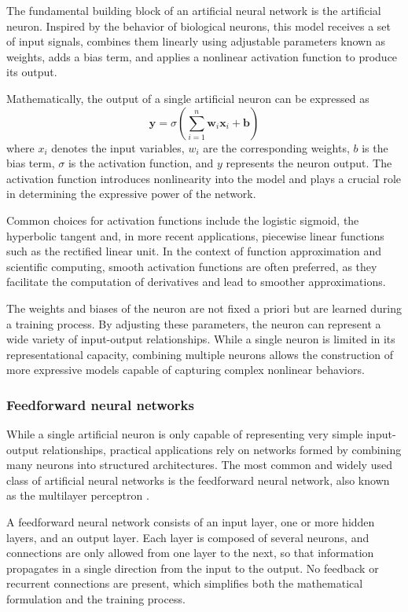 \documentclass[final,1p,times]{elsarticle}
\theoremstyle{definition}
\begin{document}
The fundamental building block of an artificial neural network is the artificial neuron. Inspired by the behavior of biological neurons, this model receives a set of input signals, combines them linearly using adjustable parameters known as weights, adds a bias term, and applies a nonlinear activation function to produce its output.

Mathematically, the output of a single artificial neuron can be expressed as
\[
\mathbf{y} = \sigma\left( \sum_{i=1}^{n} \mathbf{w}_i \mathbf{x}_i + \mathbf{b} \right)
\]
where $x_i$ denotes the input variables, $w_i$ are the corresponding weights, $b$ is the bias term, $\sigma$ is the activation function, and $y$ represents the neuron output. The activation function introduces nonlinearity into the model and plays a crucial role in determining the expressive power of the network.

Common choices for activation functions include the logistic sigmoid, the hyperbolic tangent and, in more recent applications, piecewise linear functions such as the rectified linear unit. In the context of function approximation and scientific computing, smooth activation functions are often preferred, as they facilitate the computation of derivatives and lead to smoother approximations.

The weights and biases of the neuron are not fixed a priori but are learned during a training process. By adjusting these parameters, the neuron can represent a wide variety of input-output relationships. While a single neuron is limited in its representational capacity, combining multiple neurons allows the construction of more expressive models capable of capturing complex nonlinear behaviors.

\subsubsection{Feedforward neural networks}

While a single artificial neuron is only capable of representing very simple input-output relationships, practical applications rely on networks formed by combining many neurons into structured architectures. The most common and widely used class of artificial neural networks is the feedforward neural network, also known as the multilayer perceptron \cite{marsland2011machine}.

A feedforward neural network consists of an input layer, one or more hidden layers, and an output layer. Each layer is composed of several neurons, and connections are only allowed from one layer to the next, so that information propagates in a single direction from the input to the output. No feedback or recurrent connections are present, which simplifies both the mathematical formulation and the training process.
\end{document}
